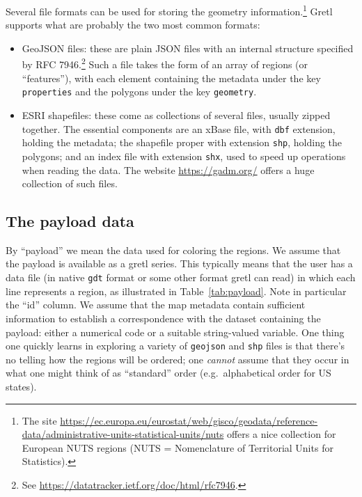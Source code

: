 \documentclass{article}
\begin{document}
Several file formats can be used for storing the geometry
information.\footnote{The site
\url{https://ec.europa.eu/eurostat/web/gisco/geodata/reference-data/administrative-units-statistical-units/nuts}
offers a nice collection for European NUTS regions (NUTS =
Nomenclature of Territorial Units for Statistics).}
Gretl supports what are probably the two most common formats:
\begin{itemize}
\item GeoJSON files: these are plain JSON files with an internal
  structure specified by RFC 7946.\footnote{See
    \url{https://datatracker.ietf.org/doc/html/rfc7946}.} Such a file takes
  the form of an array of regions (or ``features''), with each element
  containing the metadata under the key \texttt{properties} and the
  polygons under the key \texttt{geometry}.
\item ESRI shapefiles: these come as collections of several files,
  usually zipped together. The essential components are an
  \textsf{xBase} file, with \texttt{dbf} extension, holding the
  metadata; the shapefile proper with extension \texttt{shp}, holding
  the polygons; and an index file with extension \texttt{shx}, used to
  speed up operations when reading the data. The website
  \url{https://gadm.org/} offers a huge collection of such files.
\end{itemize}

\subsection{The payload data}
\label{sec:payload}

By ``payload'' we mean the data used for coloring the regions.  We
assume that the payload is available as a gretl series. This typically
means that the user has a data file (in native \texttt{gdt} format or
some other format gretl can read) in which each line represents a
region, as illustrated in Table~\ref{tab:payload}. Note in particular
the ``id'' column.  We assume that the map metadata contain sufficient
information to establish a correspondence with the dataset containing
the payload: either a numerical code or a suitable string-valued
variable.  One thing one quickly learns in exploring a variety of
\texttt{geojson} and \texttt{shp} files is that there's no telling how
the regions will be ordered; one \textit{cannot} assume that they
occur in what one might think of as ``standard'' order (e.g.\
alphabetical order for US states).
\end{document}
